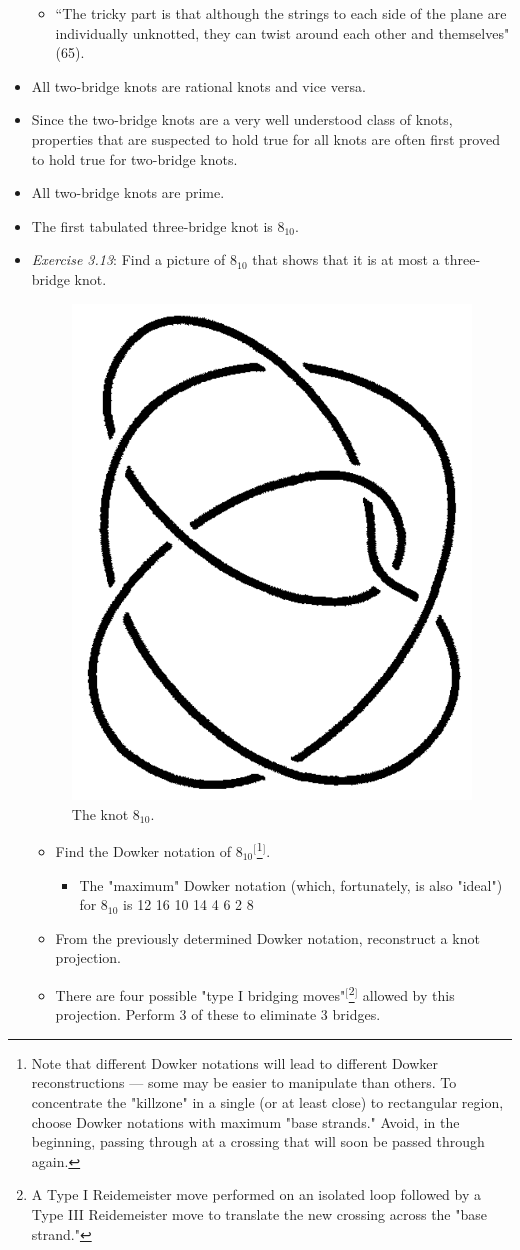 \documentclass[titlepage]{article}
\numberwithin{figure}{section}
\numberwithin{table}{section}
\numberwithin{equation}{section}
\newcommand{\dq}[2]{``#1" (#2).}
\begin{document}
\begin{itemize}
    \begin{itemize}
        \item \dq{The tricky part is that although the strings to each side of the plane
        are individually unknotted, they can twist around each other and themselves}{65}
    \end{itemize}
    \item All two-bridge knots are rational knots and vice versa.
    \item Since the two-bridge knots are a very well understood class of knots, properties that are suspected to hold true for all knots are often first proved to hold true for two-bridge knots.
    \item All two-bridge knots are prime.
    \item The first tabulated three-bridge knot is $8_{10}$.
    \item \emph{Exercise 3.13}: Find a picture of $8_{10}$ that shows that it is at most a three-bridge knot.
    \begin{figure}[h!]
        \centering
        \includegraphics[width=0.12\linewidth]{Blender/ex3-13.png}
        \caption{The knot $8_{10}$.}
        \label{fig:ex3-13}
    \end{figure}
    \begin{itemize}
        \item Find the Dowker notation of $8_{10}$$^[$\footnote{Note that different Dowker notations will lead to different Dowker reconstructions --- some may be easier to manipulate than others. To concentrate the "killzone" in a single (or at least close) to rectangular region, choose Dowker notations with maximum "base strands." Avoid, in the beginning, passing through at a crossing that will soon be passed through again.}$^]$.
        \begin{itemize}
            \item The "maximum" Dowker notation (which, fortunately, is also "ideal") for $8_{10}$ is 12 16 10 14 4 6 2 8
        \end{itemize}
        \item From the previously determined Dowker notation, reconstruct a knot projection.
        \item There are four possible "type I bridging moves"$^[$\footnote{A Type I Reidemeister move performed on an isolated loop followed by a Type III Reidemeister move to translate the new crossing across the "base strand."}$^]$ allowed by this projection. Perform 3 of these to eliminate 3 bridges.
$$
\end{itemize}
\end{itemize}
\end{document}
